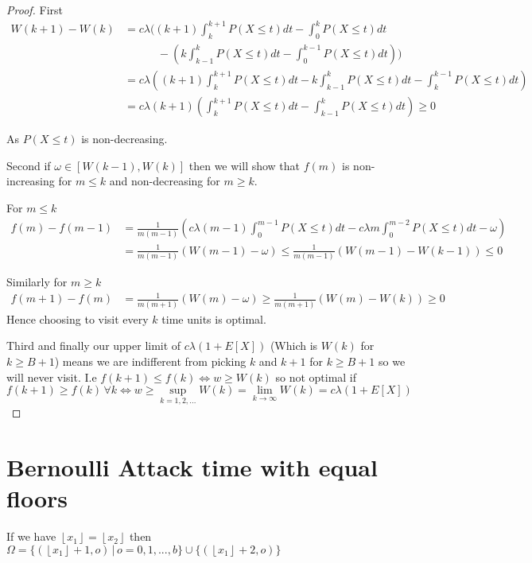 \documentclass[a4paper,10pt]{article}
\newcommand{\floor}[1]{\left \lfloor #1 \right \rfloor}
\theoremstyle{definition}
\theoremstyle{definition}
\theoremstyle{remark}
\theoremstyle{definition}
\begin{document}
\begin{proof}
First
\begin{align*}
W(k+1)-W(k)&= c \lambda ((k+1) \int_{k}^{k+1} P(X \leq t)dt - \int_{0}^{k} P(X \leq t)dt \\ & \quad \quad \quad -(k \int_{k-1}^{k} P(X \leq t)dt - \int_{0}^{k-1} P(X \leq t)dt)) \\ &=c \lambda ((k+1) \int_{k}^{k+1} P(X \leq t)dt -k \int_{k-1}^{k} P(X \leq t)dt - \int_{k}^{k-1} P(X \leq t)dt)\\ &=c \lambda (k+1) (\int_{k}^{k+1} P(X \leq t)dt - \int_{k-1}^{k} P(X \leq t)dt) \geq 0
\end{align*}

As $P(X \leq t)$ is non-decreasing.

Second if $\omega \in [W(k-1),W(k)]$ then we will show that $f(m)$ is non-increasing for $m \leq k$ and non-decreasing for $m \geq k$.

For $m \leq k$
\begin{align*}
f(m)-f(m-1)&=\frac{1}{m(m-1)}(c \lambda (m-1) \int_{0}^{m-1} P(X \leq t) dt - c \lambda m \int_{0}^{m-2} P(X \leq t) dt - \omega) \\
&=\frac{1}{m(m-1)}(W(m-1)-\omega) \leq \frac{1}{m(m-1)} (W(m-1)-W(k-1)) \leq 0
\end{align*}

Similarly for $m \geq k$
\begin{align*}
f(m+1)-f(m)&= \frac{1}{m(m+1)} (W(m)-\omega) \geq \frac{1}{m(m+1)} (W(m)-W(k)) \geq 0
\end{align*}
Hence choosing to visit every $k$ time units is optimal.

Third and finally our upper limit of $c \lambda (1+E[X])$ (Which is $W(k)$ for $k \geq B+1$) means we are indifferent from picking $k$ and $k+1$ for $k \geq B+1$ so we will never visit. I.e
$f(k+1) \leq f(k) \iff w \geq W(k)$ so not optimal if $f(k+1) \geq f(k) \, \forall k \iff w \geq \sup\limits_{k=1,2,...} W(k)=\lim\limits_{k \rightarrow \infty} W(k)=c \lambda (1+E[X])$
\end{proof}

\section{Bernoulli Attack time with equal floors}
\label{Bernoulli Attack time with equal floors}

If we have $\floor{x_{1}}=\floor{x_{2}}$ then $\Omega= \{(\floor{x_{1}}+1,o) \, | \, o=0,1,...,b \} \cup \{(\floor{x_{1}}+2,o) \}$
\end{document}
